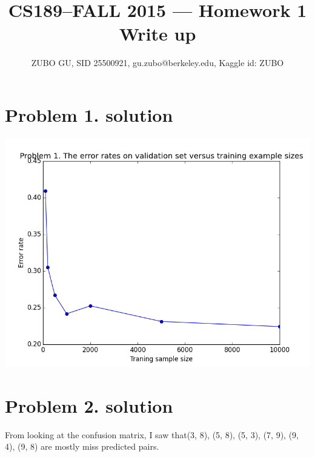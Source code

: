 \documentclass[11pt]{article}
\title{CS189--FALL 2015 --- Homework 1 Write up}
\author{ZUBO GU, SID 25500921, gu.zubo@berkeley.edu, Kaggle id: ZUBO}
\date{}
\begin{document}
\maketitle

\section*{Problem 1. solution}

\includegraphics[scale=0.5]{figure1}

\newpage
\section*{Problem 2. solution}
From looking at the confusion matrix, I saw that(3, 8), (5, 8), (5, 3), (7, 9), (9, 4), (9, 8) are mostly miss predicted pairs.
\end{document}
